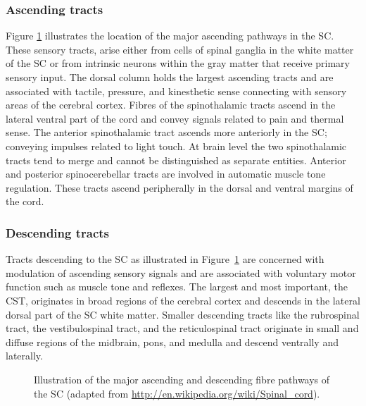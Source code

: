 \subsubsection{Ascending tracts}
\label{sec:chap2:ascendingtracts}
Figure \ref{fig:chapter 2 spinal_cord_anatomy} illustrates the location of the major ascending pathways in the {\gls{SC}}. These sensory tracts, arise either from cells of spinal ganglia in the white matter of the {\gls{SC}} or from intrinsic neurons within the gray matter that receive primary sensory input. The dorsal column holds the largest ascending tracts and are associated with tactile, pressure, and kinesthetic sense connecting with sensory areas of the cerebral cortex. Fibres of the spinothalamic tracts ascend in the lateral ventral part of the cord and convey signals related to pain and thermal sense. The anterior spinothalamic tract ascends more anteriorly in the {\gls{SC}}; conveying impulses related to light touch. At brain level the two spinothalamic tracts tend to merge and cannot be distinguished as separate entities. Anterior and posterior spinocerebellar tracts are involved in automatic muscle tone regulation. These tracts ascend peripherally in the dorsal and ventral margins of the cord.

\subsubsection{Descending tracts}
\label{sec:chap2:descendingtracts}
Tracts descending to the {\gls{SC}} as illustrated in Figure~\ref{fig:chapter 2 spinal_cord_anatomy} are concerned with modulation of ascending sensory signals and are associated with voluntary motor function such as muscle tone and reflexes. The largest and most important, the {\gls{CST}}, originates in broad regions of the cerebral cortex and descends in the lateral dorsal part of the {\gls{SC}} white matter. Smaller descending tracts like the rubrospinal tract, the vestibulospinal tract, and the reticulospinal tract originate in small and diffuse regions of the midbrain, pons, and medulla and descend ventrally and laterally.
\begin{figure}
 \centering
  \caption{Illustration of the major ascending and descending fibre pathways of the {\protect\gls{SC}} (adapted from \url{http://en.wikipedia.org/wiki/Spinal_cord}).}
  \label{fig:chapter 2 spinal_cord_anatomy}
\end{figure}

